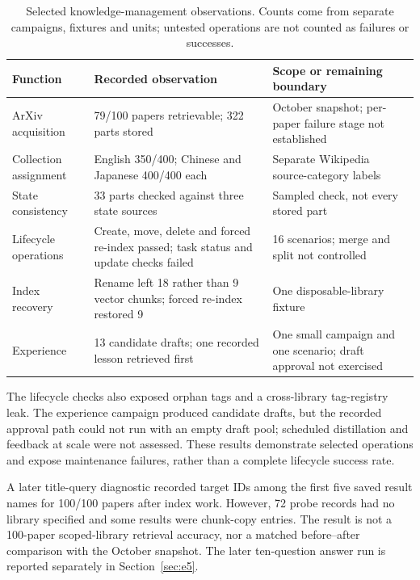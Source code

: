 \begin{table}[t]
\centering
\small
\setlength{\tabcolsep}{4pt}
\caption{Selected knowledge-management observations. Counts come from
separate campaigns, fixtures and units; untested operations are not counted
as failures or successes.}
\label{tab:management}
\begin{tabular}{@{}p{}p{}p{}@{}}
\toprule
Function & Recorded observation & Scope or remaining boundary \\
\midrule
ArXiv acquisition & 79/100 papers retrievable; 322 parts stored & October snapshot; per-paper failure stage not established \\
Collection assignment & English 350/400; Chinese and Japanese 400/400 each & Separate Wikipedia source-category labels \\
State consistency & 33 parts checked against three state sources & Sampled check, not every stored part \\
Lifecycle operations & Create, move, delete and forced re-index passed; task status and update checks failed & 16 scenarios; merge and split not controlled \\
Index recovery & Rename left 18 rather than 9 vector chunks; forced re-index restored 9 & One disposable-library fixture \\
Experience & 13 candidate drafts; one recorded lesson retrieved first & One small campaign and one scenario; draft approval not exercised \\
\bottomrule
\end{tabular}
\end{table}

The lifecycle checks also exposed orphan tags and a cross-library tag-registry
leak. The experience campaign produced candidate drafts, but the recorded
approval path could not run with an empty draft pool; scheduled distillation
and feedback at scale were not assessed. These results demonstrate selected
operations and expose maintenance failures, rather than a complete lifecycle
success rate.

A later title-query diagnostic recorded target IDs among the first five saved
result names for 100/100 papers after index work. However, 72 probe records
had no library specified and some results were chunk-copy entries. The result
is not a 100-paper scoped-library retrieval accuracy, nor a matched before--after
comparison with the October snapshot. The later ten-question answer run is
reported separately in Section~\ref{sec:e5}.

